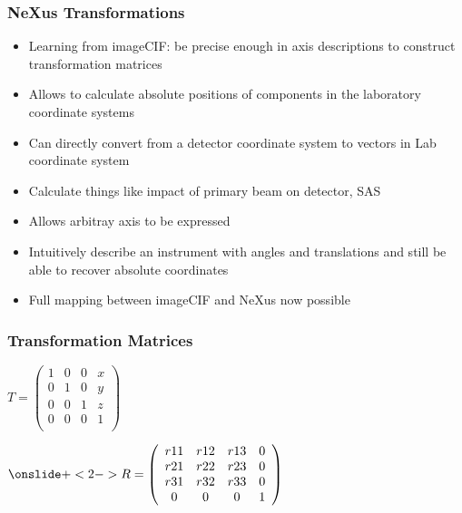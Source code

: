 \documentclass{beamer}
\begin{document}
\begin{frame} \frametitle{NeXus Transformations}
\begin{itemize}
\item Learning from imageCIF: be precise enough in axis descriptions to construct transformation 
 matrices 
\item Allows to calculate absolute positions of components in the laboratory coordinate systems
\item Can directly convert from a detector coordinate system to  
 vectors in Lab coordinate system
\item Calculate things like impact of primary beam on detector, SAS
\item Allows arbitray axis to be expressed
\item Intuitively describe an instrument with angles and translations and still be able
 to recover absolute coordinates
\item Full mapping between imageCIF and NeXus now possible
\end{itemize}
\end{frame}


\begin{frame} \frametitle{Transformation Matrices}
\begin{math}
T = \left( \begin{array}{cccc}
1 & 0 & 0 & x\\
0 & 1 & 0 & y\\
0 & 0 & 1 & z\\
0 & 0 & 0 & 1\\
\end{array} \right)
\end{math}

\begin{math}
\onslide+<2-> 
R = \left( \begin{array}{cccc}
r11 & r12 & r13 & 0\\
r21 & r22 & r23 & 0\\
r31 & r32 & r33 & 0\\
0 & 0 & 0 & 1\\
\end{array} \right)
\end{math}

\end{frame}
\end{document}
